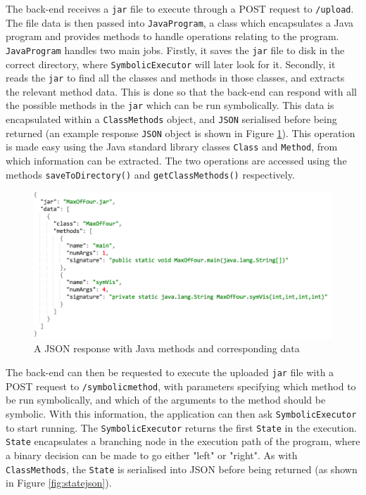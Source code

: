 \documentclass[titlepage,11pt]{article}
\begin{document}
The back-end receives a \texttt{jar} file to execute through a POST request to \texttt{/upload}. The file data is then passed into \texttt{JavaProgram}, a class which encapsulates a Java program and provides methods to handle operations relating to the program. \texttt{JavaProgram} handles two main jobs. Firstly, it saves the \texttt{jar} file to disk in the correct directory, where \texttt{SymbolicExecutor} will later look for it. Secondly, it reads the \texttt{jar} to find all the classes and methods in those classes, and extracts the relevant method data. This is done so that the back-end can respond with all the possible methods in the \texttt{jar} which can be run symbolically. This data is encapsulated within a \texttt{ClassMethods} object, and \texttt{JSON} serialised before being returned (an example response \texttt{JSON} object is shown in Figure \ref{fig:methodsjson}). This operation is made easy using the Java standard library classes \texttt{Class} and \texttt{Method}, from which information can be extracted. The two operations are accessed using the methods \texttt{saveToDirectory()} and \texttt{getClassMethods()} respectively. \\

\begin{figure}
\centering
\includegraphics[scale=0.6]{methodsjson.png}
\caption{A JSON response with Java methods and corresponding data}
\label{fig:methodsjson}
\end{figure}

The back-end can then be requested to execute the uploaded \texttt{jar} file with a POST request to \texttt{/symbolicmethod}, with parameters specifying which method to be run symbolically, and which of the arguments to the method should be symbolic. With this information, the application can then ask \texttt{SymbolicExecutor} to start running. The \texttt{SymbolicExecutor} returns the first \texttt{State} in the execution. \texttt{State} encapsulates a branching node in the execution path of the program, where a binary decision can be made to go either "left" or "right". As with \texttt{ClassMethods}, the \texttt{State} is serialised into JSON before being returned (as shown in Figure \ref{fig:statejson}). \\
\end{document}
